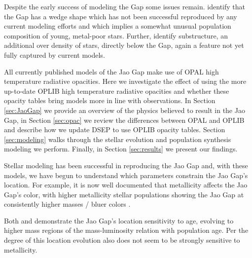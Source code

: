 Despite the early success of modeling the Gap some issues remain.
\citet{Jao2020, Jao2021} identify that the Gap has a wedge shape which has not been
successful reproduced by any current modeling efforts and which implies a
somewhat unusual population composition of young, metal-poor stars. Further,
\citet{Jao2020} identify substructure, an additional over density of stars,
directly below the Gap, again a feature not yet fully captured by current
models. 

All currently published models of the Jao Gap make use of OPAL high temperature
radiative opacities. Here we investigate the effect of using the more
up-to-date OPLIB high temperature radiative opacities and whether these opacity
tables bring models more in line with observations. In Section \ref{sec:JaoGap}
we provide an overview of the physics believed to result in the Jao Gap, in
Section \ref{sec:opac} we review the differences between OPAL and OPLIB and
describe how we update DSEP to use OPLIB opacity tables. Section
\ref{sec:modeling} walks through the stellar evolution and population synthesis
modeling we perform. Finally, in Section \ref{sec:results} we present our
findings. 

Stellar modeling has been successful in reproducing the Jao Gap
\citep[e.g.][]{Feiden2021,Mansfield2021} and, with these models, we have begun
to understand which parameters constrain the Jao Gap's location. For example,
it is now well documented that metallicity affects the Jao Gap's color, with
higher metallicity stellar populations showing the Jao Gap at consistently
higher masses / bluer colors \citep{Mansfield2021}.

Both \citeauthor{Feiden2021} and \citeauthor{Mansfield2021} demonstrate the Jao
Gap's location sensitivity to age, evolving to higher mass regions of the
mass-luminosity relation with population age. Per \citet{Mansfield2021} the
degree of this location evolution also does not seem to be strongly sensitive
to metallicity. 
